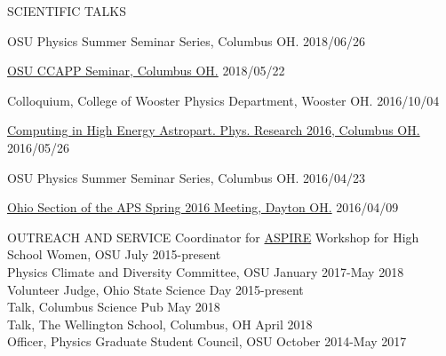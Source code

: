\documentclass{resume} %
\begin{document}
\begin{rSection}{SCIENTIFIC TALKS}
\begin{etaremune}
\item OSU Physics Summer Seminar Series, Columbus OH. \hfill 2018/06/26

\item \href{http://ccapp.osu.edu/pastseminars.html#past}{OSU CCAPP Seminar, Columbus OH.} \hfill 2018/05/22

\item Colloquium, College of Wooster Physics Department, Wooster OH. \hfill 2016/10/04

\item \href{http://ccapp.osu.edu/workshops/CHEAPR2016/workshop.html}{Computing in High Energy Astropart. Phys. Research 2016, Columbus OH.} \hfill 2016/05/26

\item OSU Physics Summer Seminar Series, Columbus OH. \hfill 2016/04/23

\item \href{http://meetings.aps.org/Meeting/OSS16/Session/D3.6}{Ohio Section of the APS Spring 2016 Meeting, Dayton OH.} \hfill 2016/04/09
\end{etaremune}

\begin{rSection}{OUTREACH AND SERVICE}
Coordinator for \href{u.osu.edu/aspire}{ASPIRE} Workshop for High School Women, OSU \hfill July 2015-present\\
Physics Climate and Diversity Committee, OSU \hfill January 2017-May 2018\\
Volunteer Judge, Ohio State Science Day \hfill 2015-present\\
Talk, Columbus Science Pub \hfill  May 2018\\
Talk, The Wellington School, Columbus, OH \hfill April 2018\\
Officer, Physics Graduate Student Council, OSU \hfill October 2014-May 2017 \\
\end{rSection}
\vspace{-0.30cm}
\newpage


\end{rSection}
\end{document}
